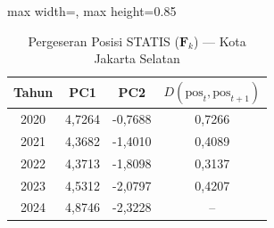 \begin{table}[H]
\centering
\caption{Pergeseran Posisi STATIS ($\mathbf{F}_k$) --- Kota Jakarta Selatan} \label{tab:app1jarak_statis_skor_kota_jakarta_selatan}
\begin{adjustbox}{max width=\textwidth, max height=0.85\textheight}
\begin{tabular}{|c|c|c|c|}
\hline
\textbf{Tahun} & \textbf{PC1} & \textbf{PC2} & \textbf{$D(\text{pos}_t, \text{pos}_{t+1})$} \\
\hline
2020 & 4,7264 & -0,7688 & 0,7266 \\
2021 & 4,3682 & -1,4010 & 0,4089 \\
2022 & 4,3713 & -1,8098 & 0,3137 \\
2023 & 4,5312 & -2,0797 & 0,4207 \\
2024 & 4,8746 & -2,3228 & -- \\
\hline
\end{tabular}
\end{adjustbox}
\end{table}